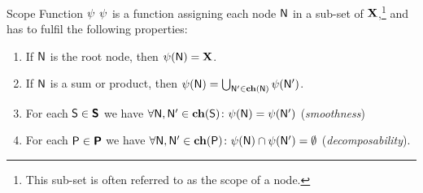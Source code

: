 \begin{frame}{Scope Function $\psi$}
$\psi$ is a function assigning each node $\mathsf{N}$ in a sub-set of $\mathbf{X}$,\footnote{\scriptsize This sub-set is often referred to as the scope of a node.} and has to fulfil the following properties:
\begin{defbox}
\begin{enumerate}
\item If $\mathsf{N}$ is the root node, then $\psi(\mathsf{N}) = \mathbf{X}$.
\item If $\mathsf{N}$ is a sum or product, then $\psi(\mathsf{N}) = \bigcup_{\mathsf{N}' \in \mathbf{ch}(\mathsf{N})} \psi(\mathsf{N}')$.
\item For each $\mathsf{S} \in \bm{\mathsf{S}}$ we have $\forall \mathsf{N}, \mathsf{N}' \in \mathbf{ch}(\mathsf{S})\colon \psi(\mathsf{N}) = \psi(\mathsf{N}')$ (\emph{smoothness})
\item For each $\mathsf{P} \in \bm{\mathsf{P}}$ we have $\forall \mathsf{N}, \mathsf{N}' \in \mathbf{ch}(\mathsf{P})\colon \psi(\mathsf{N}) \cap \psi(\mathsf{N}') = \emptyset$ (\emph{decomposability}).
\end{enumerate}
\end{defbox}
\end{frame}

